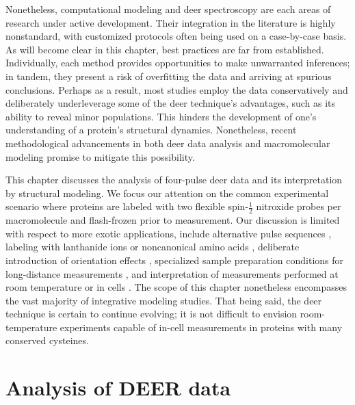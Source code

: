 Nonetheless, computational modeling and \gls{deer} spectroscopy are each areas of research under active development. Their integration in the literature is highly nonstandard, with customized protocols often being used on a case-by-case basis. As will become clear in this chapter, best practices are far from established. Individually, each method provides opportunities to make unwarranted inferences; in tandem, they present a risk of overfitting the data and arriving at spurious conclusions. Perhaps as a result, most studies employ the data conservatively and deliberately underleverage some of the \gls{deer} technique's advantages, such as its ability to reveal minor populations. This hinders the development of one’s understanding of a protein’s structural dynamics. Nonetheless, recent methodological advancements in both \gls{deer} data analysis and macromolecular modeling promise to mitigate this possibility.

This chapter discusses the analysis of four-pulse \gls{deer} data \citep*{Pannier2000} and its interpretation by structural modeling. We focus our attention on the common experimental scenario where proteins are labeled with two flexible spin-$\frac{1}{2}$ nitroxide probes per macromolecule and flash-frozen prior to measurement. Our discussion is limited with respect to more exotic applications, include alternative pulse sequences \citep*{Borbat2013, Breitgoff2017, Mentink-Vigier2013, Spindler2015}, labeling with lanthanide ions \citep*{Giannoulis2019, Matalon2013, Potapov2010, Yagi2011} or noncanonical amino acids \citep*{Braun2019, Schmidt2015, Schmidt2015a}, deliberate introduction of orientation effects \citep*{Bowen2018, Endeward2009, Marko2013}, specialized sample preparation conditions for long-distance measurements \citep*{ElMkami2015, Schmidt2016}, and interpretation of measurements performed at room temperature \citep*{Graenz2018, Kuzhelev2016, Meyer2015} or in cells \citep*{Azarkh2019, Joseph2016, Singewald2019, Yang2019}. The scope of this chapter nonetheless encompasses the vast majority of integrative modeling studies. That being said, the \gls{deer} technique is certain to continue evolving; it is not difficult to envision room-temperature experiments capable of in-cell measurements in proteins with many conserved cysteines.

\section{Analysis of DEER data}\label{sec:deerintro_deeranalysis}

